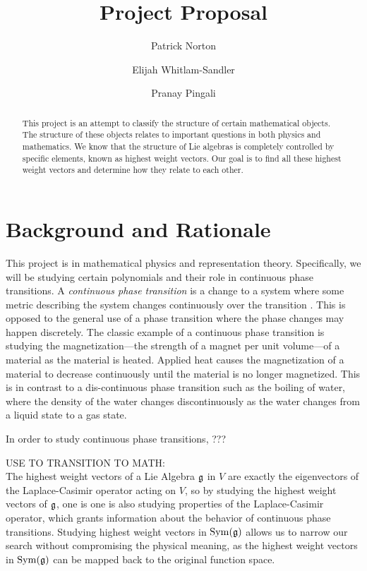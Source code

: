 \documentclass[11pt, reqno]{amsart}
\title{Project Proposal}
\author{Patrick Norton \and Elijah Whitlam-Sandler \and Pranay Pingali}
\begin{document}
\begin{abstract}
  This project is an attempt to classify the structure of certain mathematical
  objects. %
  The structure of these objects relates to important questions in both
  physics and mathematics. %
  We know that the structure of Lie algebras is completely controlled by
  specific elements, known as highest weight vectors. Our goal is to find all
  these highest weight vectors and determine how they relate to each other.
\end{abstract}

\maketitle

\section{Background and Rationale}

This project is in mathematical physics and representation theory. Specifically, we will be studying certain polynomials and their role in continuous phase transitions. A \emph{continuous phase transition} is a change to a system where some metric describing the system changes continuously over the transition \cite[\S1]{Sa06}. This is opposed to the general use of a phase transition where the phase changes may happen discretely. The classic example of a continuous phase transition is studying the magnetization---the strength of a magnet per unit volume---of a material as the material is heated. Applied heat causes the magnetization of a material to decrease continuously until the material is no longer magnetized. This is in contrast to a dis-continuous phase transition such as the boiling of water, where the density of the water changes discontinuously as the water changes from a liquid state to a gas state.

In order to study continuous phase transitions, ???

USE TO TRANSITION TO MATH:\\
The highest weight vectors of a Lie Algebra $\mathfrak{g}$ in $V$ are exactly the eigenvectors 
of the Laplace-Casimir operator acting on $V$, so by studying the highest weight  
vectors of $\mathfrak{g}$, one is one is also studying properties of the Laplace-Casimir 
operator, which grants information about the behavior of continuous phase transitions. 
Studying highest weight vectors in $\operatorname{Sym}(\mathfrak{g})$ allows us to narrow our search without
compromising the physical meaning, as the highest weight vectors in $\operatorname{Sym}(\mathfrak{g})$ can be mapped back to the original function space. 
\end{document}
